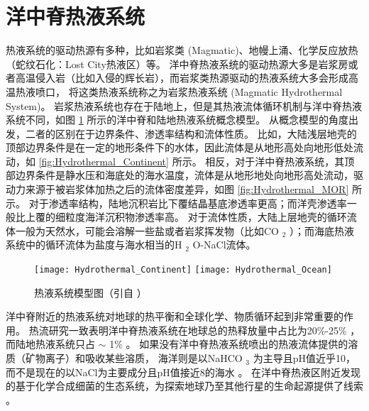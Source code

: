 \section{洋中脊热液系统}  %
热液系统的驱动热源有多种，比如岩浆类 (Magmatic)、地幔上涌、化学反应放热（蛇纹石化：Lost City热液区）等。
洋中脊热液系统的驱动热源大多是岩浆房或者高温侵入岩（比如入侵的辉长岩），而岩浆类热源驱动的热液系统大多会形成高温热液喷口，
将这类热液系统称之为岩浆热液系统 (Magmatic Hydrothermal System)。
岩浆热液系统也存在于陆地上，但是其热液流体循环机制与洋中脊热液系统不同，如图 \ref{fig:HydrothermalSystemConcept} 所示的洋中脊和陆地热液系统概念模型。
从概念模型的角度出发，二者的区别在于边界条件、渗透率结构和流体性质。
比如，大陆浅层地壳的顶部边界条件是在一定的地形条件下的水体，因此流体是从地形高处向地形低处流动，如 \ref{fig:Hydrothermal_Continent} 所示。
相反，对于洋中脊热液系统，其顶部边界条件是静水压和海底处的海水温度，流体是从地形地处向地形高处流动，驱动力来源于被岩浆体加热之后的流体密度差异，如图 \ref{fig:Hydrothermal_MOR} 所示。
对于渗透率结构，陆地沉积岩比下覆结晶基底渗透率更高；而洋壳渗透率一般比上覆的细粒度海洋沉积物渗透率高。
对于流体性质，大陆上层地壳的循环流体一般为天然水，可能会溶解一些盐或者岩浆挥发物（比如CO $ _2 $ ）；而海底热液系统中的循环流体为盐度与海水相当的H $ _2 $ O-NaCl流体。



\begin{figure} [htbp]
	\centering%
	{\texttt{[image: Hydrothermal\_Continent]} } 
	\hspace{0.0\textwidth} 
	{\texttt{[image: Hydrothermal\_Ocean]} }  %
	\caption[热液系统模型图]{热液系统模型图（引自 \cite{ingebritsen2010numerical} ）} 
	\label{fig:HydrothermalSystemConcept} 
\end{figure} 

洋中脊附近的热液系统对地球的热平衡和全球化学、物质循环起到非常重要的作用。
热流研究一致表明洋中脊热液系统在地球总的热释放量中占比为20\%-25\%  \citep{sclater1980heat,stein1994constraints} ，而陆地热液系统只占 $ \sim $ 1\%  \citep{ingebritsen2010numerical} 。
如果没有洋中脊热液系统喷出的热液流体提供的溶质（矿物离子）和吸收某些溶质，
海洋则是以NaHCO $ _3 $ 为主导且pH值近乎10，而不是现在的以NaCl为主要成分且pH值接近8的海水 \citep{mackenzie1966chemical} 。
在洋中脊热液区附近发现的基于化学合成细菌的生态系统，为探索地球乃至其他行星的生命起源提供了线索 \citep{lutz1993ecology,baross1983growth} 。

